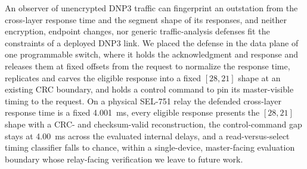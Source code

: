 An observer of unencrypted DNP3 traffic can fingerprint an outstation from the cross-layer response
time and the segment shape of its responses, and neither encryption, endpoint changes, nor generic
traffic-analysis defenses fit the constraints of a deployed DNP3 link. We placed the defense in the
data plane of one programmable switch, where it holds the acknowledgment and response and releases them
at fixed offsets from the request to normalize the response time, replicates and carves the eligible
response into a fixed $[28,21]$ shape at an existing CRC boundary, and holds a control command to pin
its master-visible timing to the request. On a physical SEL-751 relay the defended cross-layer response
time is a fixed 4.001~ms, every eligible response presents the $[28,21]$ shape with a CRC- and
checksum-valid reconstruction, the control-command gap stays at 4.00~ms across the evaluated internal
delays, and a read-versus-select timing classifier falls to chance, within a single-device,
master-facing evaluation boundary whose relay-facing verification we leave to future work.

